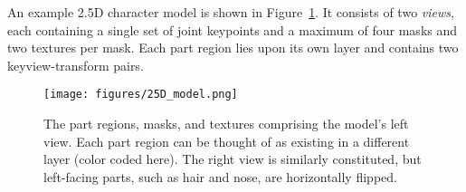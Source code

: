 \begin{comment}
As a result of flipping silhouette segments and translating different part regions of the original image, discontinuities and undefined values may occur within the texture.
This can be corrected for by automatically constructing an infill mask identifying where such artifacts occur and infilling them, either with generative or classical approaches, in a post-processing step.
We further use infilling to remove part regions which do not translate, but are hidden upon the character's backside.
The results in distinct \textit{front} and \textit{back} textures.
\end{comment}

An example 2.5D character model is shown in Figure~\ref{fig:25D_model}. It consists of two \textit{views}, each containing a single set of joint keypoints and a maximum of four masks and two textures per mask. Each part region lies upon its own layer and contains two keyview-transform pairs.



\begin{figure}[ht]
\centering
\texttt{[image: figures/25D\_model.png]}
\caption{ The part regions, masks, and textures comprising the model's left view. Each part region can be thought of as existing in a different layer (color coded here). The right view is similarly constituted, but left-facing parts, such as hair and nose, are horizontally flipped.}
\label{fig:25D_model}
\end{figure}





